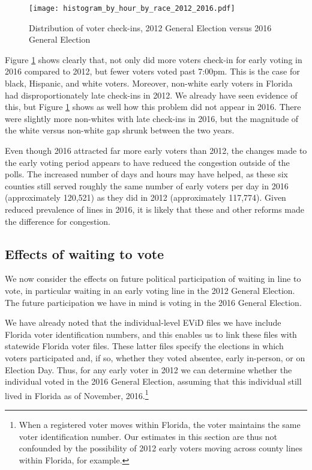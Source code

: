 \documentclass[12pt,titlepage]{article}
\begin{document}
\begin{figure}[!ht]
  \caption{Distribution of voter check-ins, 2012 General Election versus 2016 General Election}
  \label{fig:race2012and2016}
  \centering
  \centering\texttt{[image: histogram\_by\_hour\_by\_race\_2012\_2016.pdf]}
\end{figure}

Figure \ref{fig:race2012and2016} shows clearly that, not only did more
voters check-in for early voting in 2016 compared to 2012, but fewer
voters voted past 7:00pm.  This is the case for black, Hispanic, and
white voters. Moreover, non-white early voters in Florida had
disproportionately late check-ins in 2012.  We already have seen
evidence of this, but Figure \ref{fig:race2012and2016} shows as well
how this problem did not appear in 2016.  There were slightly more
non-whites with late check-ins in 2016, but the magnitude of the white
versus non-white gap shrunk between the two years.

Even though 2016 attracted far more early voters than 2012, the
changes made to the early voting period appears to have reduced the
congestion outside of the polls. The increased number of days and hours may have helped,
as these six counties still served roughly the same number of early
voters per day in 2016 (approximately 120,521) as they did in 2012
(approximately 117,774).  Given reduced prevalence of lines in 2016, it
is likely that these and other reforms made the difference for congestion.







\subsection*{Effects of waiting to vote}

We now consider the effects on future political participation of
waiting in line to vote, in particular waiting in an early voting line
in the 2012 General Election.  The future participation we have in
mind is voting in the 2016 General Election.

We have already noted that the individual-level EViD files we have
include Florida voter identification numbers, and this enables us to
link these files with statewide Florida voter files.  These latter
files specify the elections in which voters participated and, if so,
whether they voted absentee, early in-person, or on Election Day.  Thus, for any
early voter in 2012 we can determine whether the individual voted in
the 2016 General Election, assuming that this individual still lived
in Florida as of November, 2016.\footnote{When a registered voter
  moves within Florida, the voter maintains the same voter
  identification number.  Our estimates in this section are thus not
  confounded by the possibility of 2012 early voters moving across
  county lines within Florida, for example.}  
\end{document}
